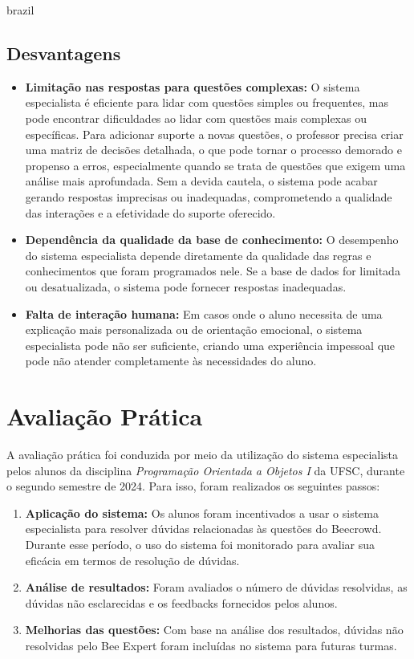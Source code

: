 \begin{otherlanguage*}{brazil}
\subsection{Desvantagens}
\begin{itemize}
	\item \textbf{Limitação nas respostas para questões complexas:} O sistema especialista é eficiente para lidar com questões simples ou frequentes, mas pode encontrar dificuldades ao lidar com questões mais complexas ou específicas. Para adicionar suporte a novas questões, o professor precisa criar uma matriz de decisões detalhada, o que pode tornar o processo demorado e propenso a erros, especialmente quando se trata de questões que exigem uma análise mais aprofundada. Sem a devida cautela, o sistema pode acabar gerando respostas imprecisas ou inadequadas, comprometendo a qualidade das interações e a efetividade do suporte oferecido.
    \item \textbf{Dependência da qualidade da base de conhecimento:} O desempenho do sistema especialista depende diretamente da qualidade das regras e conhecimentos que foram programados nele. Se a base de dados for limitada ou desatualizada, o sistema pode fornecer respostas inadequadas.
    \item \textbf{Falta de interação humana:} Em casos onde o aluno necessita de uma explicação mais personalizada ou de orientação emocional, o sistema especialista pode não ser suficiente, criando uma experiência impessoal que pode não atender completamente às necessidades do aluno.
\end{itemize}

\section{Avaliação Prática}

A avaliação prática foi conduzida por meio da utilização do sistema especialista pelos alunos da disciplina \textit{Programação Orientada a Objetos I} da UFSC, durante o segundo semestre de 2024. Para isso, foram realizados os seguintes passos:

\begin{enumerate}
    \item \textbf{Aplicação do sistema:} Os alunos foram incentivados a usar o sistema especialista para resolver dúvidas relacionadas às questões do Beecrowd. Durante esse período, o uso do sistema foi monitorado para avaliar sua eficácia em termos de resolução de dúvidas.
    \item \textbf{Análise de resultados:} Foram avaliados o número de dúvidas resolvidas, as dúvidas não esclarecidas e os feedbacks fornecidos pelos alunos.
    \item \textbf{Melhorias das questões:} Com base na análise dos resultados, dúvidas não resolvidas pelo Bee Expert foram incluídas no sistema para futuras turmas.
\end{enumerate}


\end{otherlanguage*}
